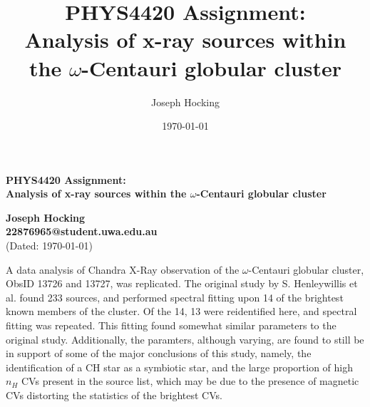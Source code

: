 \documentclass[aps,
                pra,  
                a4paper, 
                amsmath, 
                amssymb, 
                preprint,
                tightenlines,  
                amsfonts,
                nofootinbib,
                notitlepage
            ]{revtex4-2}
\begin{document}
\title{PHYS4420 Assignment:\\Analysis of x-ray sources within the $\omega$-Centauri globular cluster}

\author{Joseph Hocking}
\noaffiliation

\date{\today}

\begin{center}
        
    \Large
    \textbf{PHYS4420 Assignment:\\Analysis of x-ray sources within the $\omega$-Centauri globular cluster}
        
    \vspace{1.5cm}
    \normalsize
    \textbf{Joseph Hocking\\22876965@student.uwa.edu.au}\\
    (Dated: \today)
\end{center}

\begin{center}
    A data analysis of Chandra X-Ray observation of the $\omega$-Centauri globular cluster, ObsID 13726 and 13727, was replicated. The original study by S. Henleywillis et al. found 233 sources, and performed spectral fitting upon 14 of the brightest known members of the cluster. Of the 14, 13 were reidentified here, and spectral fitting was repeated. This fitting found somewhat similar parameters to the original study. Additionally, the paramters, although varying, are found to still be in support of some of the major conclusions of this study, namely, the identification of a CH star as a symbiotic star, and the large proportion of high $n_H$ CVs present in the source list, which may be due to the presence of magnetic CVs distorting the statistics of the brightest CVs.
\end{center}
\end{document}
